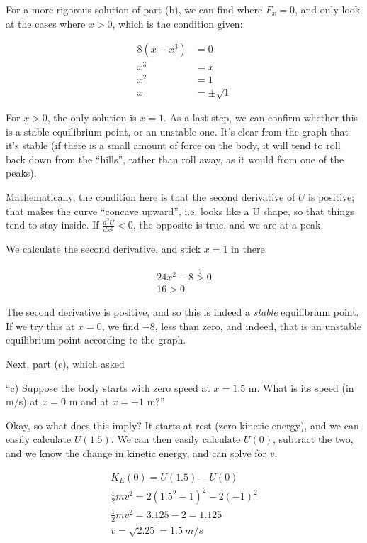 \documentclass[8.01x]{subfiles}
\begin{document}
For a more rigorous solution of part (b), we can find where $F_x = 0$, and only look at the cases where $x > 0$, which is the condition given:

\begin{align}
8(x - x^3) &= 0\\
x^3 &= x\\
x^2 &= 1\\
x &= \pm \sqrt{1}
\end{align}

For $x > 0$, the only solution is $x = 1$. As a last step, we can confirm whether this is a stable equilibrium point, or an unstable one. It's clear from the graph that it's stable (if there is a small amount of force on the body, it will tend to roll back down from the ``hills'', rather than roll away, as it would from one of the peaks).

Mathematically, the condition here is that the second derivative of $U$ is positive; that makes the curve ``concave upward'', i.e. looks like a U shape, so that things tend to stay inside. If $\displaystyle \frac{d^2U}{dx^2} < 0$, the opposite is true, and we are at a peak.

We calculate the second derivative, and stick $x = 1$ in there:

\begin{align}
24x^2 - 8 \overset{?}{>} 0\\
16 > 0
\end{align}

The second derivative is positive, and so this is indeed a \emph{stable} equilibrium point. If we try this at $x = 0$, we find $-8$, less than zero, and indeed, that is an unstable equilibrium point according to the graph.

Next, part (c), which asked

``c) Suppose the body starts with zero speed at $x = 1.5$ m. What is its speed (in m/s) at $x = 0$ m and at $x = -1$ m?''

Okay, so what does this imply? It starts at rest (zero kinetic energy), and we can easily calculate $U(1.5)$. We can then easily calculate $U(0)$, subtract the two, and we know the change in kinetic energy, and can solve for $v$.

\begin{align}
K_E(0) = U(1.5) - U(0)\\
\frac{1}{2} m v^2 = 2(1.5^2 - 1)^2 - 2(-1)^2\\
\frac{1}{2} m v^2 = 3.125 - 2 = 1.125\\
v = \sqrt{2.25} = \SI{1.5}{m/s}
\end{align}
\end{document}
